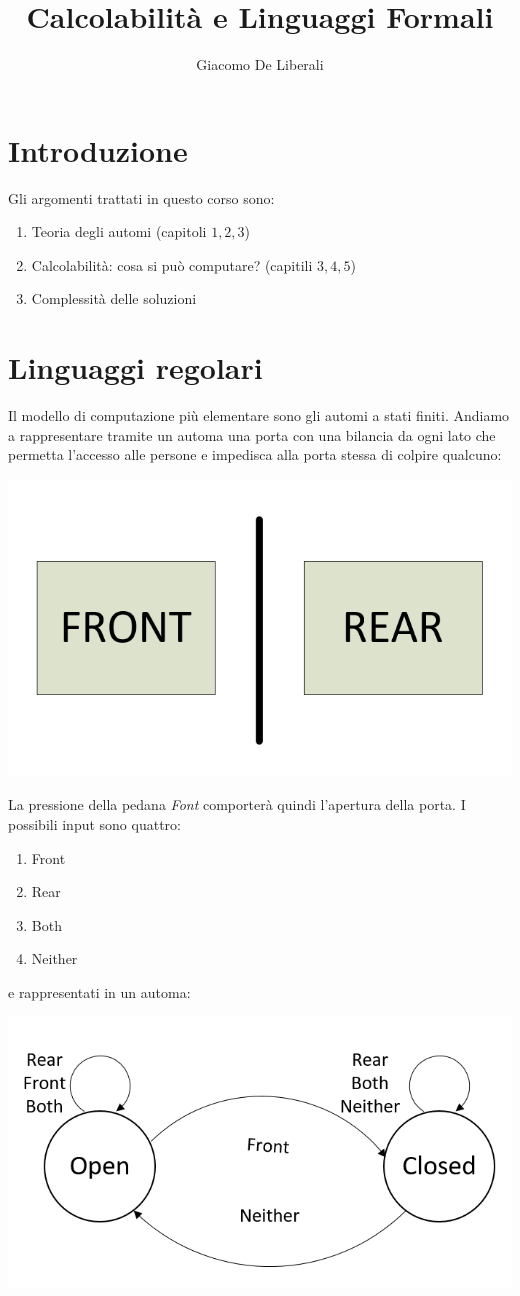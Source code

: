 \documentclass[italian]{article}
\author{Giacomo De Liberali}
\newcommand{\dateright}[1]{\normalfont{\normalsize{\hfill #1 \\}}}
\begin{document}
	
\title{Calcolabilità e Linguaggi Formali}
\maketitle

\tableofcontents
\pagebreak

\section{Introduzione}
\dateright{21 Settembre 2017}
Gli argomenti trattati in questo corso sono:

\begin{enumerate}
	\item Teoria degli automi (capitoli $1,2,3$)
	\item Calcolabilità: cosa si può computare? (capitili $3,4,5$) 
	\item Complessità delle soluzioni
\end{enumerate}

\section{Linguaggi regolari}
Il modello di computazione più elementare sono gli automi a stati finiti. Andiamo a rappresentare tramite un automa una porta con una bilancia da ogni lato che permetta l'accesso alle persone e impedisca alla porta stessa di colpire qualcuno:

\begin{center}
	\includegraphics[width=0.3\linewidth]{images/door}
\end{center}
La pressione della pedana \textit{Font} comporterà quindi l'apertura della porta. I possibili input sono quattro:
\begin{enumerate}
	\item Front
	\item Rear
	\item Both
	\item Neither
\end{enumerate}

e rappresentati in un automa:

\begin{center}
	\includegraphics[width=0.5\linewidth]{images/automa1}
\end{center}
\end{document}
